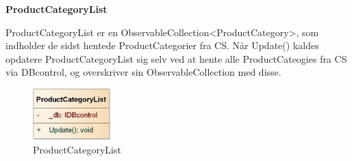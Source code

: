 \textbf{ProductCategoryList}

ProductCategoryList er en ObservableCollection<ProductCategory>, som indholder de sidst hentede ProductCategorier fra \gls{CS}. Når Update() kaldes opdatere ProductCategoryList sig selv ved at hente alle ProductCateogies fra \gls{CS} via DBcontrol, og overskriver sin ObservableCollection med disse.

\begin{figure}[H]
    \centering
    \includegraphics[width=30mm]{Systemdesign/Frontend/BLL/Pics/ProductCategoryList}
    \caption{ProductCategoryList}
    \label{fig:ProductCategoryList}
\end{figure}

\bigskip
